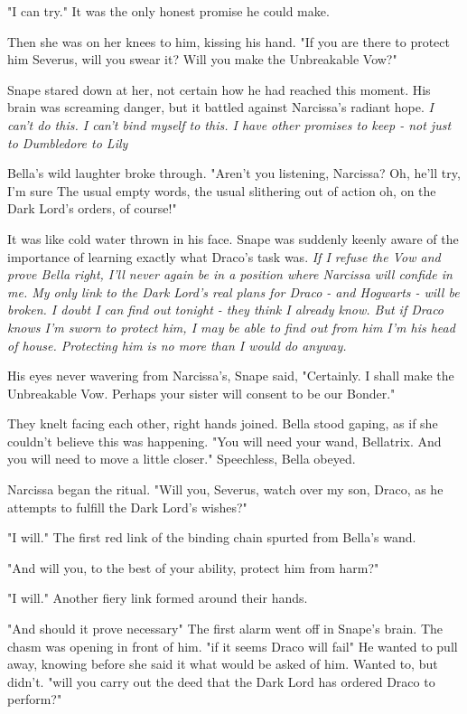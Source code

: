 "I can try." It was the only honest promise he could make.

Then she was on her knees to him, kissing his hand. "If you are there to protect him{\el} Severus, will you swear it? Will you make the Unbreakable Vow?"

Snape stared down at her, not certain how he had reached this moment. His brain was screaming danger, but it battled against Narcissa's radiant hope. \emph{I can't do this. I can't bind myself to this. I have other promises to keep - not just to Dumbledore{\el} to Lily{\el}}

Bella's wild laughter broke through. "Aren't you listening, Narcissa? Oh, he'll try, I'm sure{\el} The usual empty words, the usual slithering out of action{\el} oh, on the Dark Lord's orders, of course!"

It was like cold water thrown in his face. Snape was suddenly keenly aware of the importance of learning exactly what Draco's task was. \emph{If I refuse the Vow and prove Bella right, I'll never again be in a position where Narcissa will confide in me. My only link to the Dark Lord's real plans for Draco - and Hogwarts - will be broken. I doubt I can find out tonight - they think I already know. But if Draco knows I'm sworn to protect him, I may be able to find out from him{\el} I'm his head of house. Protecting him is no more than I would do anyway.}

His eyes never wavering from Narcissa's, Snape said, "Certainly. I shall make the Unbreakable Vow. Perhaps your sister will consent to be our Bonder."

They knelt facing each other, right hands joined. Bella stood gaping, as if she couldn't believe this was happening. "You will need your wand, Bellatrix. And you will need to move a little closer." Speechless, Bella obeyed.

Narcissa began the ritual. "Will you, Severus, watch over my son, Draco, as he attempts to fulfill the Dark Lord's wishes?"

"I will." The first red link of the binding chain spurted from Bella's wand.

"And will you, to the best of your ability, protect him from harm?"

"I will." Another fiery link formed around their hands.

"And should it prove necessary{\el}" The first alarm went off in Snape's brain. The chasm was opening in front of him. "{\el}if it seems Draco will fail{\el}" He wanted to pull away, knowing before she said it what would be asked of him. Wanted to, but didn't. "{\el}will you carry out the deed that the Dark Lord has ordered Draco to perform?"

